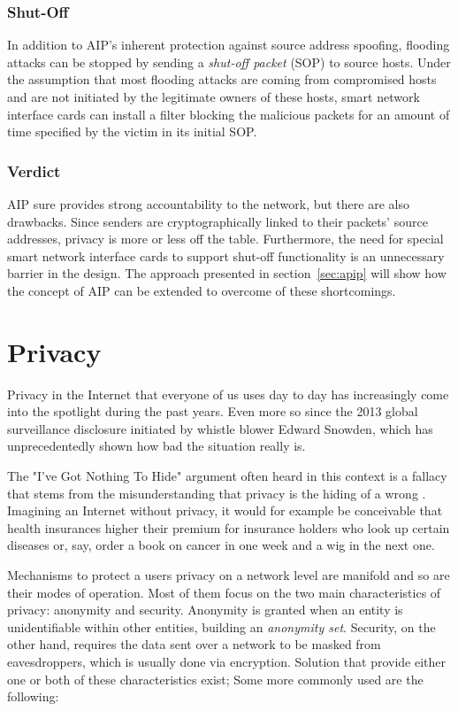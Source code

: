 \documentclass{acm_proc_article-sp}
\begin{document}
\subsubsection{Shut-Off}
In addition to AIP's inherent protection against source address spoofing, flooding attacks can be stopped by sending a \emph{shut-off packet} (SOP) to source hosts. Under the assumption that most flooding attacks are coming from compromised hosts and are not initiated by the legitimate owners of these hosts, smart network interface cards can install a filter blocking the malicious packets for an amount of time specified by the victim in its initial SOP.

\subsubsection{Verdict}
AIP sure provides strong accountability to the network, but there are also drawbacks. Since senders are cryptographically linked to their packets' source addresses, privacy is more or less off the table. Furthermore, the need for special smart network interface cards to support shut-off functionality is an unnecessary barrier in the design. The approach presented in section~\ref{sec:apip} will show how the concept of AIP can be extended to overcome of these shortcomings.


\section{Privacy}
\label{sec:priv}
Privacy in the Internet that everyone of us uses day to day has increasingly come into the spotlight during the past years. Even more so since the 2013 global surveillance disclosure initiated by whistle blower Edward Snowden, which has unprecedentedly shown how bad the situation really is.

The "I've Got Nothing To Hide" argument often heard in this context is a fallacy that stems from the misunderstanding that privacy is the hiding of a wrong \cite{solove}. Imagining an Internet without privacy, it would for example be conceivable that health insurances higher their premium for insurance holders who look up certain diseases or, say, order a book on cancer in one week and a wig in the next one.

Mechanisms to protect a users privacy on a network level are manifold and so are their modes of operation. Most of them focus on the two main characteristics of privacy: anonymity and security. Anonymity is granted when an entity is unidentifiable within other entities, building an \emph{anonymity set}. Security, on the other hand, requires the data sent over a network to be masked from eavesdroppers, which is usually done via encryption. Solution that provide either one or both of these characteristics exist; Some more commonly used are the following:
\end{document}

